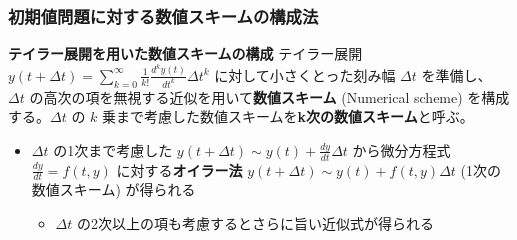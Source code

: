 \documentclass[dvipdfmx,aspectratio=169,20pt]{beamer}
\newcommand{\myfontsetting}[3]{{\fontsize{#1}{#2}\selectfont #3}}
\begin{document}
\begin{frame}
\frametitle{\myfontsetting{22pt}{22pt}{初期値問題に対する数値スキームの構成法}}
\begin{block}{\myfontsetting{20pt}{20pt}{\bf テイラー展開を用いた数値スキームの構成}}
\myfontsetting{14pt}{14pt}{テイラー展開 \myfontsetting{10pt}{10pt}{$\displaystyle y(t+\varDelta t)=\sum_{k=0}^\infty \frac{1}{k!}\frac{d^k y(t)}{dt^k}\varDelta t^k$} に対して小さくとった刻み幅 $\varDelta t$ を準備し、 $\varDelta t$ の高次の項を無視する近似を用いて{\bf 数値スキーム} \myfontsetting{10pt}{10pt}{(Numerical scheme)} を構成する。$\varDelta t$ の $k$ 乗まで考慮した数値スキームを{\bf k次の数値スキーム}と呼ぶ。}
\end{block}
\begin{itemize}
    \item \myfontsetting{12pt}{12pt}{$\varDelta t$ の1次まで考慮した \myfontsetting{10pt}{10pt}{$y(t+\varDelta t)\sim y(t)+\frac{dy}{dt}\varDelta t$} から微分方程式 \myfontsetting{10pt}{10pt}{$\frac{dy}{dt}=f(t,y)$} に対する{\bf オイラー法} \myfontsetting{10pt}{10pt}{$y(t+\varDelta t)\sim y(t)+f(t,y)\varDelta t$} \myfontsetting{10pt}{10pt}{(1次の数値スキーム)} が得られる}
    \begin{itemize}
        \item \myfontsetting{12pt}{12pt}{$\varDelta t$ の2次以上の項も考慮するとさらに旨い近似式が得られる}
    \end{itemize}
\end{itemize}

\end{frame}
\end{document}
